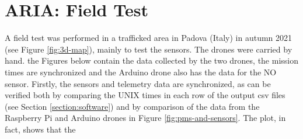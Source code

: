 \chapter{ARIA: Field Test}
A field test was performed in a trafficked area in Padova (Italy) in autumn 2021 (see Figure \ref{fig:3d-map}), mainly to test the sensors. The drones were carried by hand. the Figures below contain the data collected by the two drones, the mission times are synchronized and the Arduino drone also has the data for the NO sensor.
Firstly, the sensors and telemetry data are synchronized, as can be verified both by comparing the UNIX times in each row of the output csv files (see Section \ref{section:software}) and by comparison of the data from the Raspberry Pi and Arduino drones in Figure \ref{fig:pms-and-sensors}. The plot, in fact, shows that the



